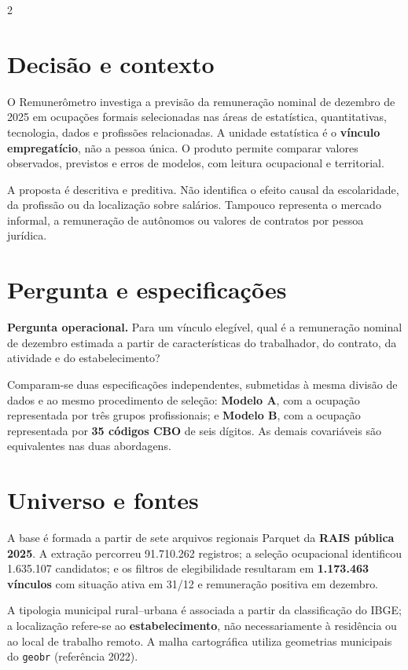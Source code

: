 \documentclass[10pt,a4paper]{article}
\begin{document}
\begin{multicols}{2}\raggedcolumns
\section{Decisão e contexto}
O Remunerômetro investiga a previsão da remuneração nominal de dezembro de 2025 em ocupações formais selecionadas nas áreas de estatística, quantitativas, tecnologia, dados e profissões relacionadas. A unidade estatística é o \textbf{vínculo empregatício}, não a pessoa única. O produto permite comparar valores observados, previstos e erros de modelos, com leitura ocupacional e territorial.

A proposta é descritiva e preditiva. Não identifica o efeito causal da escolaridade, da profissão ou da localização sobre salários. Tampouco representa o mercado informal, a remuneração de autônomos ou valores de contratos por pessoa jurídica.

\section{Pergunta e especificações}
\textbf{Pergunta operacional.} Para um vínculo elegível, qual é a remuneração nominal de dezembro estimada a partir de características do trabalhador, do contrato, da atividade e do estabelecimento?

Comparam-se duas especificações independentes, submetidas à mesma divisão de dados e ao mesmo procedimento de seleção: \textbf{Modelo A}, com a ocupação representada por três grupos profissionais; e \textbf{Modelo B}, com a ocupação representada por \textbf{35 códigos CBO} de seis dígitos. As demais covariáveis são equivalentes nas duas abordagens.

\section{Universo e fontes}
A base é formada a partir de sete arquivos regionais Parquet da \textbf{RAIS pública 2025}. A extração percorreu 91.710.262 registros; a seleção ocupacional identificou 1.635.107 candidatos; e os filtros de elegibilidade resultaram em \textbf{1.173.463 vínculos} com situação ativa em 31/12 e remuneração positiva em dezembro.

A tipologia municipal rural--urbana é associada a partir da classificação do IBGE; a localização refere-se ao \textbf{estabelecimento}, não necessariamente à residência ou ao local de trabalho remoto. A malha cartográfica utiliza geometrias municipais do \texttt{geobr} (referência 2022).


\end{multicols}
\end{document}
